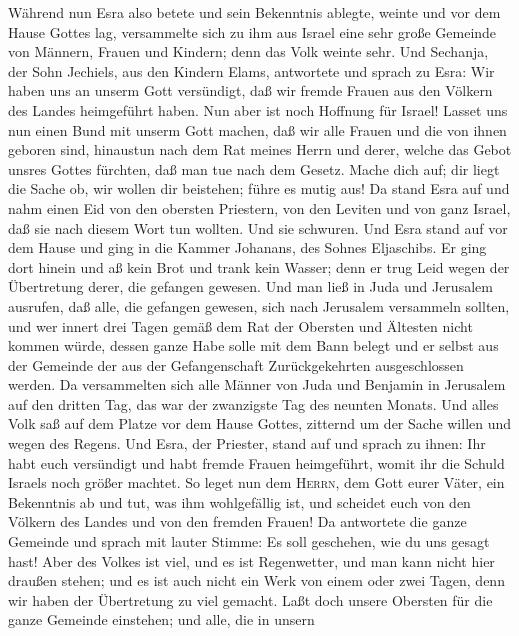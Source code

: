  Während nun Esra also betete und sein Bekenntnis ablegte,
weinte und vor dem Hause Gottes lag, versammelte sich zu ihm aus Israel
eine sehr große Gemeinde von Männern, Frauen und Kindern; denn das Volk
weinte sehr.  Und Sechanja, der Sohn Jechiels, aus den
Kindern Elams, antwortete und sprach zu Esra: Wir haben uns an unserm
Gott versündigt, daß wir fremde Frauen aus den Völkern des Landes
heimgeführt haben. Nun aber ist noch Hoffnung für Israel! 
Lasset uns nun einen Bund mit unserm Gott machen, daß wir alle Frauen
und die von ihnen geboren sind, hinaustun nach dem Rat meines Herrn und
derer, welche das Gebot unsres Gottes fürchten, daß man tue nach dem
Gesetz.  Mache dich auf; dir liegt die Sache ob, wir
wollen dir beistehen; führe es mutig aus!  Da stand Esra
auf und nahm einen Eid von den obersten Priestern, von den Leviten und
von ganz Israel, daß sie nach diesem Wort tun wollten. Und sie schwuren.
 Und Esra stand auf vor dem Hause und ging in die Kammer
Johanans, des Sohnes Eljaschibs. Er ging dort hinein und aß kein Brot
und trank kein Wasser; denn er trug Leid wegen der Übertretung derer,
die gefangen gewesen.  Und man ließ in Juda und Jerusalem
ausrufen, daß alle, die gefangen gewesen, sich nach Jerusalem versammeln
sollten,  und wer innert drei Tagen gemäß dem Rat der
Obersten und Ältesten nicht kommen würde, dessen ganze Habe solle mit
dem Bann belegt und er selbst aus der Gemeinde der aus der
Gefangenschaft Zurückgekehrten ausgeschlossen werden.  Da
versammelten sich alle Männer von Juda und Benjamin in Jerusalem auf den
dritten Tag, das war der zwanzigste Tag des neunten Monats. Und alles
Volk saß auf dem Platze vor dem Hause Gottes, zitternd um der Sache
willen und wegen des Regens.  Und Esra, der Priester,
stand auf und sprach zu ihnen: Ihr habt euch versündigt und habt fremde
Frauen heimgeführt, womit ihr die Schuld Israels noch größer machtet.
 So leget nun dem \textsc{Herrn}, dem Gott eurer Väter,
ein Bekenntnis ab und tut, was ihm wohlgefällig ist, und scheidet euch
von den Völkern des Landes und von den fremden Frauen! 
Da antwortete die ganze Gemeinde und sprach mit lauter Stimme: Es soll
geschehen, wie du uns gesagt hast!  Aber des Volkes ist
viel, und es ist Regenwetter, und man kann nicht hier draußen stehen;
und es ist auch nicht ein Werk von einem oder zwei Tagen, denn wir haben
der Übertretung zu viel gemacht.  Laßt doch unsere
Obersten für die ganze Gemeinde einstehen; und alle, die in unsern
